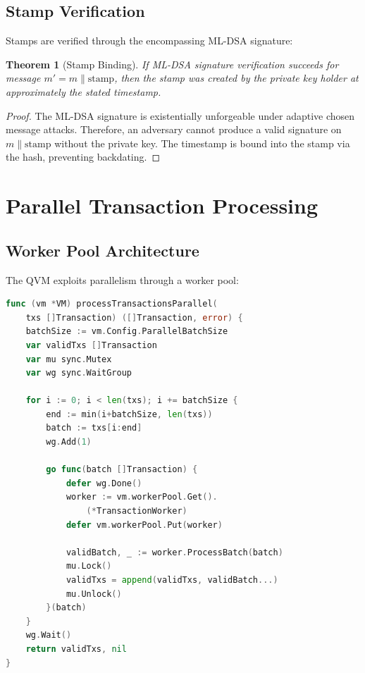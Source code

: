 \documentclass[11pt,a4paper]{article}
\newtheorem{theorem}{Theorem}
\begin{document}
\subsection{Stamp Verification}

Stamps are verified through the encompassing ML-DSA signature:

\begin{theorem}[Stamp Binding]
If ML-DSA signature verification succeeds for message $m' = m \| \text{stamp}$, then the stamp was created by the private key holder at approximately the stated timestamp.
\end{theorem}

\begin{proof}
The ML-DSA signature is existentially unforgeable under adaptive chosen message attacks. Therefore, an adversary cannot produce a valid signature on $m \| \text{stamp}$ without the private key. The timestamp is bound into the stamp via the hash, preventing backdating.
\end{proof}

\section{Parallel Transaction Processing}

\subsection{Worker Pool Architecture}

The QVM exploits parallelism through a worker pool:

\begin{lstlisting}[language=Go,caption={Parallel Processing}]
func (vm *VM) processTransactionsParallel(
    txs []Transaction) ([]Transaction, error) {
    batchSize := vm.Config.ParallelBatchSize
    var validTxs []Transaction
    var mu sync.Mutex
    var wg sync.WaitGroup

    for i := 0; i < len(txs); i += batchSize {
        end := min(i+batchSize, len(txs))
        batch := txs[i:end]
        wg.Add(1)

        go func(batch []Transaction) {
            defer wg.Done()
            worker := vm.workerPool.Get().
                (*TransactionWorker)
            defer vm.workerPool.Put(worker)

            validBatch, _ := worker.ProcessBatch(batch)
            mu.Lock()
            validTxs = append(validTxs, validBatch...)
            mu.Unlock()
        }(batch)
    }
    wg.Wait()
    return validTxs, nil
}
\end{lstlisting}
\end{document}

